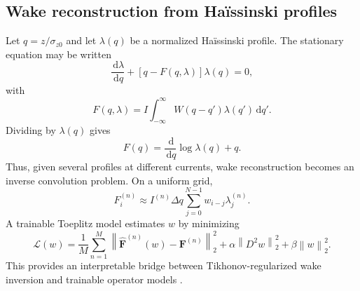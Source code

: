 \documentclass[11pt,a4paper]{article}
\providecommand{\norm}[1]{\left\lVert#1\right\rVert}
\providecommand{\dd}{\,\mathrm{d}}
\begin{document}
\begin{sloppypar}
\subsection{Wake reconstruction from Ha\"issinski profiles}
Let $q=z/\sigma_{z0}$ and let $\lambda(q)$ be a normalized Ha\"issinski profile. The stationary equation may be written
\begin{equation}
    \frac{\dd\lambda}{\dd q}
    +
    \left[
    q-F(q,\lambda)
    \right]\lambda(q)=0,
\end{equation}
with
\begin{equation}
    F(q,\lambda)
    =
    I\int_{-\infty}^{\infty}W(q-q')\lambda(q')\dd q'.
\end{equation}
Dividing by $\lambda(q)$ gives
\begin{equation}
    F(q)=\frac{\dd}{\dd q}\log\lambda(q)+q.
\end{equation}
Thus, given several profiles at different currents, wake reconstruction becomes an inverse convolution problem. On a uniform grid,
\begin{equation}
    F_i^{(n)}
    \approx
    I^{(n)}\Delta q
    \sum_{j=0}^{N-1}w_{i-j}\lambda_j^{(n)}.
\end{equation}
A trainable Toeplitz model estimates $w$ by minimizing
\begin{equation}
    \mathcal{L}(w)
    =
    \frac{1}{M}\sum_{n=1}^{M}
    \norm{\widehat{\bm{F}}^{(n)}(w)-\bm{F}^{(n)}}_2^2
    +
    \alpha\norm{D^2w}_2^2
    +
    \beta\norm{w}_2^2.
\end{equation}
This provides an interpretable bridge between Tikhonov-regularized wake inversion and trainable operator models \cite{funkner_haissinski_2025}.


\end{sloppypar}
\end{document}
